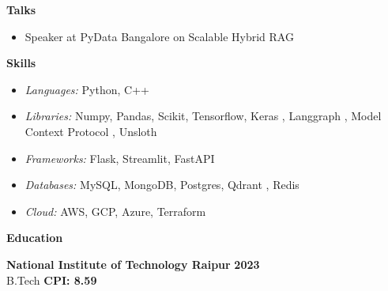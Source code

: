 \documentclass{article}%
\begin{document}
\begin{flushleft}
\bf{\Large{Talks}}
\end{flushleft}
\vspace{-1mm}
\hline
\begin{itemize}
\item Speaker at PyData Bangalore on Scalable Hybrid RAG\hfill
\href{https://www.linkedin.com/posts/pydata-bangalore_pydata-bangalore-machinelearning-activity-7298222664903495680-XK4G?utm_source=share&utm_medium=member_desktop&rcm=ACoAAC3guzgBLJ3ujDvj7NqMMjTw1_2SwpYn4dE}{\faLinkedin}\hspace{2mm}
\href{https://github.com/RheagalFire/Scalable-Hybrid-Rag}{\faGithub}\hspace{2mm}
\href{https://docs.google.com/presentation/d/1a6ENOwzwmHTZ1k66ErT51CDKL4EksXiEYehhHRsKwWU/edit?usp=sharing}{\faFilePowerpoint}
\end{itemize}

\begin{flushleft}
\bf{\Large{Skills}}
\end{flushleft}
\vspace{-1mm}
\hline
\begin{itemize}
\setlength\itemsep{0.01em}
\item \textit{Languages:} Python, C++
\item \textit{Libraries:} Numpy, Pandas, Scikit, Tensorflow, Keras , Langgraph , Model Context Protocol , Unsloth
\item \textit{Frameworks:} Flask, Streamlit, FastAPI 
\item \textit{Databases:} MySQL, MongoDB, Postgres, Qdrant , Redis
\item \textit{Cloud:} AWS, GCP, Azure, Terraform
\end{itemize}
\vspace{1mm}
\begin{flushleft}
\bf{\Large{Education}}
\end{flushleft}
\vspace{-2mm}
\hline
\vspace{2mm}

\noindent
\textbf{National Institute of Technology Raipur} \hfill \textbf{2023} \\
B.Tech \hfill \textbf{CPI: 8.59}
\end{document}
